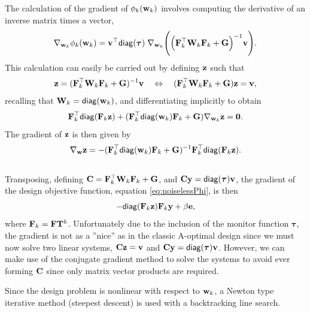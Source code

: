 \documentclass[11pt]{article}
\newcommand{\bfC}	{{\bf{C}}}
\newcommand{\bfF}	{{\bf{F}}}
\newcommand{\bfG}	{{\bf{G}}}
\newcommand{\bfH}	{{\bf{H}}}
\newcommand{\bfT}	{{\bf{T}}}
\newcommand{\bfW}	{{\bf{W}}}
\newcommand{\bfe}	{{\bf{e}}}
\newcommand{\bfv}	{{\bf{v}}}
\newcommand{\bfw}	{{\bf{w}}}
\newcommand{\bfy}	{{\bf{y}}}
\newcommand{\bfz}	{{\bf{z}}}
\newcommand{\bftau}      {{\boldsymbol \tau}}
\newcommand {\zero}  { {\bf 0} }
\newcommand{\grad}	{\ensuremath {{\bf{ \nabla}}}}
\begin{document}
The calculation of the gradient of $\phi_k(\bfw_k)$ involves computing the derivative of an inverse matrix times a vector,
\begin{equation}
\label{eq:gradObj}
\grad_{\bfw_k} \phi_k(\bfw_k) = \bfv^{\top}{\sf diag}(\bftau)\; \grad_{\bfw_k}\Bigg(\Big(\bfF_k^{\top}\bfW_k\bfF_k   + \bfG \Big)^{-1}\bfv\Bigg).
\end{equation}
This calculation can easily be carried out by defining $\bfz$ such that
\begin{equation}
\label{eq:z}
\bfz = (\bfF_k^{\top}\bfW_k\bfF_k   + \bfG)^{-1}\bfv \quad \Leftrightarrow \quad
(\bfF_k^{\top}\bfW_k\bfF_k   + \bfG)\bfz = \bfv,
\end{equation}
  recalling that $\bfW_k = {\sf diag}(\bfw_k)$, and differentiating implicitly to obtain 
\begin{equation*}
\bfF_k^{\top}{\sf diag}(\bfF_k\bfz) + (\bfF_k^{\top}{\sf diag}(\bfw_k)\bfF_k +\bfG)\grad_{\bfw_k}\bfz =\zero.
\end{equation*}
The gradient of $\bfz$ is then given by
\begin{equation*}
\nabla_{\bfw}\bfz = -(\bfF_k^{\top}{\sf diag}(\bfw_k)\bfF_k +\bfG)^{-1} \bfF_k^{\top}{\sf diag}(\bfF_k\bfz).
\end{equation*}
\\
Transposing, defining $\bfC = \bfF_k^{\top}\bfW_k\bfF_k   + \bfG$, and $\bfC\bfy ={\sf diag}(\bftau)\bfv$,  the gradient of the design objective function, equation \eqref{eq:noiselessPhi}, is then
\begin{equation}
 -{\sf diag}(\bfF_k\bfz)\bfF_k\bfy + \beta\bfe, 
\end{equation}
where $\bfF_k = \bfF\bfT^{k}$. 
Unfortunately due to the inclusion of the monitor function $\bftau$, the gradient  is not as a ''nice'' as in the classic A-optimal design since we must now solve two linear systems, $\bfC\bfz = \bfv$ and $\bfC\bfy = {\sf diag}(\bftau)\bfv$. However, we can make use of the conjugate gradient method to solve the systems to avoid ever forming $\bfC$ since only matrix vector products are required. 

Since the design problem is nonlinear with respect to $\bfw_k$, a Newton type iterative method (steepest descent) is used with a backtracking line search.
\end{document}

